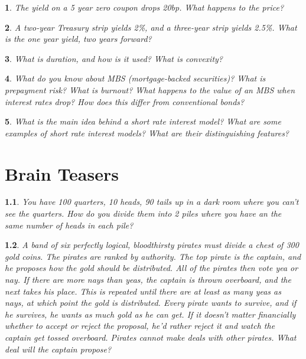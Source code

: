 \documentclass{report}
\newtheorem{problem}{}
\numberwithin{problem}{chapter} %
\begin{document}
\begin{problem}
The yield on a 5 year zero coupon drops 20bp. What happens to the price?
\end{problem}

\begin{problem}
A two-year Treasury strip yields 2\%, and a three-year strip yields 2.5\%. What is the one year yield, two years forward? 
\end{problem}

\begin{problem}
What is duration, and how is it used? What is convexity? 
\end{problem}

\begin{problem}
What do you know about MBS (mortgage-backed securities)? What is prepayment risk? What is burnout? What happens to the value of an MBS when interest rates drop? How does this differ from conventional bonds?
\end{problem}

\begin{problem}
What is the main idea behind a short rate interest model? What are some examples of short rate interest models? What are their distinguishing features?
\end{problem}


\chapter{Brain Teasers}

\begin{problem}
You have 100 quarters, 10 heads, 90 tails up in a dark room where you can't see the quarters. How do you divide them into 2 piles where you have an the same number of heads in each pile?
\end{problem}

\begin{problem}
A band of six perfectly logical, bloodthirsty pirates must divide a chest of 300 gold coins. The pirates are ranked by authority. The top pirate is the captain, and he proposes how the gold should be distributed. All of the pirates then vote yea or nay. If there are more nays than yeas, the captain is thrown overboard, and the next takes his place. This is repeated until there are at least as many yeas as nays, at which point the gold is distributed. Every pirate wants to survive, and if he survives, he wants as much gold as he can get. If it doesn't matter financially whether to accept or reject the proposal, he'd rather reject it and watch the captain get tossed overboard. Pirates cannot make deals with other pirates. What deal will the captain propose?
\end{problem}
\end{document}
